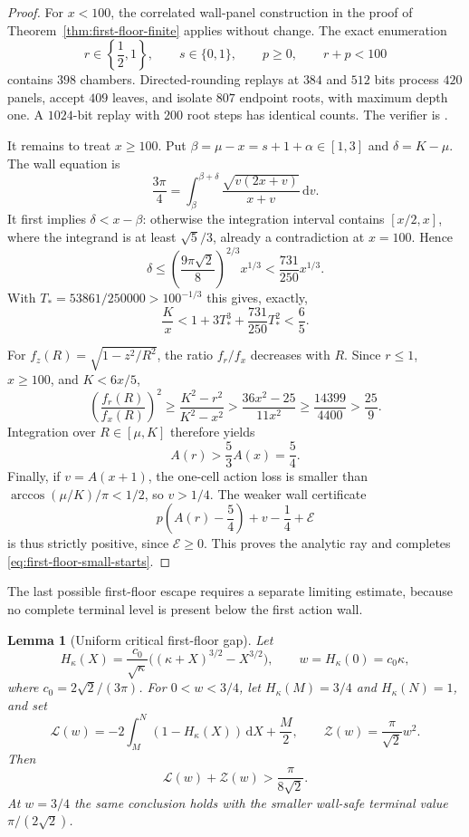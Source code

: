 \documentclass[11pt]{article}
\newtheorem{lemma}[theorem]{Lemma}
\theoremstyle{remark}
\newcommand{\dd}{\,\mathrm d}
\begin{document}
\begin{proof}
For $x<100$, the correlated wall-panel construction in the proof of
Theorem~\ref{thm:first-floor-finite} applies without change.  The exact
enumeration
\[
 r\in\left\{\frac12,1\right\},\qquad
 s\in\{0,1\},\qquad p\geq0,\qquad r+p<100
\]
contains $398$ chambers.  Directed-rounding replays at $384$ and $512$
bits process $420$ panels, accept $409$ leaves, and isolate $807$ endpoint
roots, with maximum depth one.  A $1024$-bit replay with $200$ root steps
has identical counts.  The verifier is
.

It remains to treat $x\geq100$.  Put
$\beta=\mu-x=s+1+\alpha\in[1,3]$ and $\delta=K-\mu$.  The wall equation is
\begin{equation}
 \frac{3\pi}{4}=\int_\beta^{\beta+\delta}
 \frac{\sqrt{v(2x+v)}}{x+v}\dd v.
 \label{eq:small-start-wall-integral}
\end{equation}
It first implies $\delta<x-\beta$: otherwise the integration interval
contains $[x/2,x]$, where the integrand is at least $\sqrt5/3$, already a
contradiction at $x=100$.  Hence
\[
 \delta\leq
 \left(\frac{9\pi\sqrt2}{8}\right)^{2/3}x^{1/3}
 <\frac{731}{250}x^{1/3}.
\]
With $T_*=53861/250000>100^{-1/3}$ this gives, exactly,
\[
 \frac Kx<1+3T_*^3+\frac{731}{250}T_*^2<\frac65.
\]

For $f_z(R)=\sqrt{1-z^2/R^2}$, the ratio $f_r/f_x$ decreases with $R$.
Since $r\leq1$, $x\geq100$, and $K<6x/5$,
\[
 \left(\frac{f_r(R)}{f_x(R)}\right)^2
 \geq\frac{K^2-r^2}{K^2-x^2}
 >\frac{36x^2-25}{11x^2}
 \geq\frac{14399}{4400}>\frac{25}{9}.
\]
Integration over $R\in[\mu,K]$ therefore yields
\[
 A(r)>\frac53A(x)=\frac54.
\]
Finally, if $v=A(x+1)$, the one-cell action loss is smaller than
$\arccos(\mu/K)/\pi<1/2$, so $v>1/4$.  The weaker wall certificate
\[
 p\left(A(r)-\frac54\right)+v-\frac14+\mathcal E
\]
is thus strictly positive, since $\mathcal E\geq0$.  This proves the
analytic ray and completes \eqref{eq:first-floor-small-starts}.
\end{proof}

The last possible first-floor escape requires a separate limiting estimate,
because no complete terminal level is present below the first action wall.

\begin{lemma}[Uniform critical first-floor gap]
\label{lem:critical-first-floor-gap}
Let
\[
 H_\kappa(X)=\frac{c_0}{\sqrt\kappa}
 \bigl((\kappa+X)^{3/2}-X^{3/2}\bigr),
 \qquad w=H_\kappa(0)=c_0\kappa,
\]
where $c_0=2\sqrt2/(3\pi)$.  For $0<w<3/4$, let
$H_\kappa(M)=3/4$ and $H_\kappa(N)=1$, and set
\[
 \mathcal L(w)=-2\int_M^N(1-H_\kappa(X))\dd X+\frac M2,
 \qquad \mathcal Z(w)=\frac\pi{\sqrt2}w^2.
\]
Then
\begin{equation}
 \boxed{\mathcal L(w)+\mathcal Z(w)>
 \frac\pi{8\sqrt2}.}
 \label{eq:critical-first-floor-gap}
\end{equation}
At $w=3/4$ the same conclusion holds with the smaller wall-safe terminal
value $\pi/(2\sqrt2)$.
\end{lemma}
\end{document}

